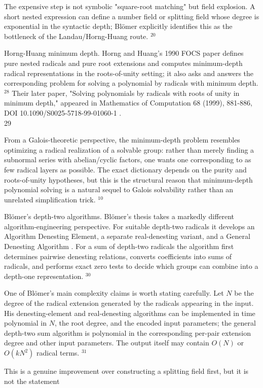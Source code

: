 \documentclass[10pt]{article}
\begin{document}
The expensive step is not symbolic "square-root matching" but field explosion. A short nested expression can define a number field or splitting field whose degree is exponential in the syntactic depth; Blömer explicitly identifies this as the bottleneck of the Landau/Horng-Huang route. ${ }^{20}$

Horng-Huang minimum depth. Horng and Huang's 1990 FOCS paper defines pure nested radicals and pure root extensions and computes minimum-depth radical representations in the roots-of-unity setting; it also asks and answers the corresponding problem for solving a polynomial by radicals with minimum depth. ${ }^{28}$ Their later paper, "Solving polynomials by radicals with roots of unity in minimum depth," appeared in Mathematics of Computation 68 (1999), 881-886, DOI 10.1090/S0025-5718-99-01060-1 .\\
29

From a Galois-theoretic perspective, the minimum-depth problem resembles optimizing a radical realization of a solvable group: rather than merely finding a subnormal series with abelian/cyclic factors, one wants one corresponding to as few radical layers as possible. The exact dictionary depends on the purity and roots-of-unity hypotheses, but this is the structural reason that minimum-depth polynomial solving is a natural sequel to Galois solvability rather than an unrelated simplification trick. ${ }^{10}$

Blömer's depth-two algorithms. Blömer's thesis takes a markedly different algorithm-engineering perspective. For suitable depth-two radicals it develops an Algorithm Denesting Element, a separate real-denesting variant, and a General Denesting Algorithm . For a sum of depth-two radicals the algorithm first determines pairwise denesting relations, converts coefficients into sums of radicals, and performs exact zero tests to decide which groups can combine into a depth-one representation. ${ }^{30}$

One of Blömer's main complexity claims is worth stating carefully. Let $N$ be the degree of the radical extension generated by the radicals appearing in the input. His denesting-element and real-denesting algorithms can be implemented in time polynomial in $N$, the root degree, and the encoded input parameters; the general depth-two sum algorithm is polynomial in the corresponding per-pair extension degree and other input parameters. The output itself may contain $O(N)$ or $O\left(k N^{2}\right)$ radical terms. ${ }^{31}$

This is a genuine improvement over constructing a splitting field first, but it is not the statement
\end{document}
